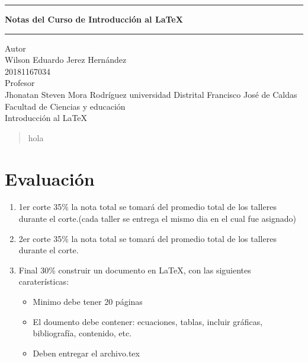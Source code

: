 \documentclass[12pt]{article}
\begin{document}

\pagestyle{empty}
\begin{center}
\begin{figure}[h]
\centering


\end{figure}
\Large
\hrule
\vspace{4mm}
\textbf{Notas del Curso de Introducción al \LaTeX}\\

\vspace{4mm}
\hrule
\large
\vfill
Autor\\

Wilson Eduardo Jerez Hernández \\
20181167034\\ 
\vfill
Profesor\\

Jhonatan Steven Mora Rodríguez
\vfill
universidad Distrital Francisco José de Caldas\\
Facultad de Ciencias y educación\\
Introducción al \LaTeX\\
\end{center}
\newpage



\tableofcontents
\newpage
\begin{abstract}
    hola
\end{abstract}
\newpage
\section{Evaluación}
        \begin{enumerate}
            \item 1er corte 35\% la nota total se tomará del promedio total de los talleres durante el corte.(cada taller se entrega el mismo dia en el cual fue asignado)
            \item 2er corte 35\% la nota total se tomará del promedio total de los talleres durante el corte.
            \item Final 30\% construir un documento en LaTeX, con las siguientes caraterísticas: 
                \begin{itemize}
                    \item Minimo debe tener 20 páginas
                    \item El doumento debe contener: ecuaciones, tablas, incluir gráficas, bibliografía, contenido, etc.
                    \item Deben entregar el archivo.tex
                \end{itemize}
    \end{enumerate}
\end{document}

